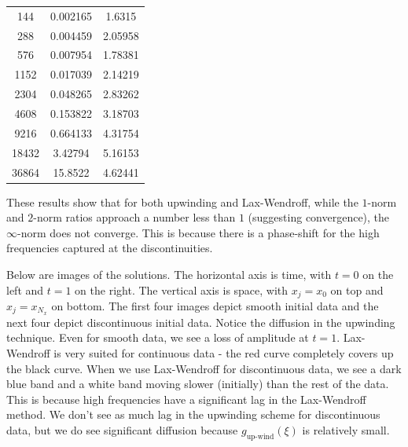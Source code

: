 \documentclass{article} %
\theoremstyle{plain}
\numberwithin{equation}{section} %
\numberwithin{figure}{section} %
\numberwithin{table}{section} %
\begin{document}
\begin{enumerate}[\ \ (a)]
\begin{table}[ht!]
\begin{tabular}{||c|c|c||}
               144 &            0.002165 &         1.6315   \\
               288 &            0.004459 &         2.05958  \\
               576 &            0.007954 &         1.78381  \\
              1152 &            0.017039 &         2.14219  \\
              2304 &            0.048265 &         2.83262  \\
              4608 &            0.153822 &         3.18703  \\
              9216 &            0.664133 &         4.31754  \\
             18432 &            3.42794  &         5.16153  \\
             36864 &           15.8522   &         4.62441  \\
            \hline\hline
            \end{tabular}
        \end{table}
        \FloatBarrier
        These results show that for both upwinding and Lax-Wendroff, while the $1$-norm and $2$-norm ratios approach a number less than $1$ (suggesting convergence), the $\infty$-norm does not converge.  This is because there is a phase-shift for the high frequencies captured at the discontinuities.
\end{enumerate}

Below are images of the solutions.  The horizontal axis is time, with $t = 0$ on the left and $t = 1$ on the right.  The vertical axis is space, with $x_j = x_0$ on top and $x_j = x_{N_x}$ on bottom.  The first four images depict smooth initial data and the next four depict discontinuous initial data.  Notice the diffusion in the upwinding technique.  Even for smooth data, we see a loss of amplitude at $t = 1$.  Lax-Wendroff is very suited for continuous data - the red curve completely covers up the black curve.  When we use Lax-Wendroff for discontinuous data, we see a dark blue band and a white band moving slower (initially) than the rest of the data.  This is because high frequencies have a significant lag in the Lax-Wendroff method.  We don't see as much lag in the upwinding scheme for discontinuous data, but we do see significant diffusion because $g_\text{up-wind}(\xi)$ is relatively small.
\end{document}
